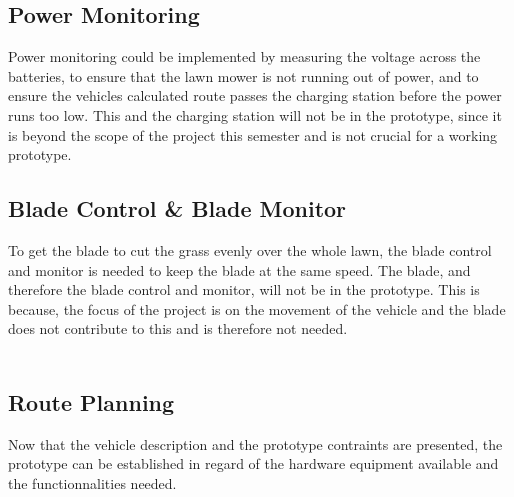 \subsection{Power Monitoring}
Power monitoring could be implemented by measuring the voltage across the batteries, to ensure that the lawn mower is not running out of power, and to ensure the vehicles calculated route passes the charging station before the power runs too low.
This and the charging station will not be in the prototype, since it is beyond the scope of the project this semester and is not crucial for a working prototype.

\subsection{Blade Control \& Blade Monitor}
To get the blade to cut the grass evenly over the whole lawn, the blade control and monitor is needed to keep the blade at the same speed.
The blade, and therefore the blade control and monitor, will not be in the prototype. This is because, the focus of the project is on the movement of the vehicle and the blade does not contribute to this and is therefore not needed.\\\\

\subsection{Route Planning}





Now that the vehicle description and the prototype contraints are presented, the prototype can be established in regard of the hardware equipment available and the functionnalities needed.
